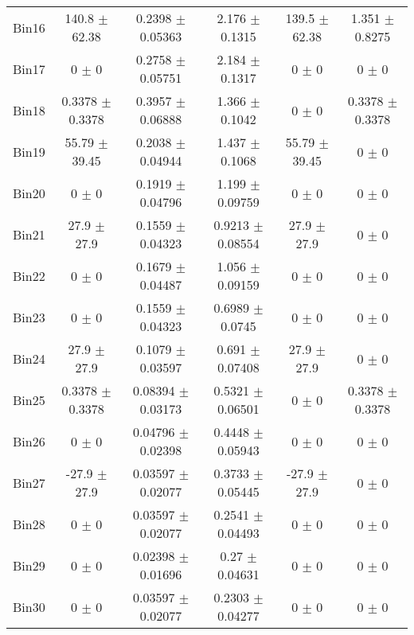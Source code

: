 \begin{tabular}{@{\extracolsep{4pt}}lccccc@{}}
     Bin16 & 140.8 $\pm$ 62.38 & 0.2398 $\pm$ 0.05363 & 2.176 $\pm$ 0.1315 & 139.5 $\pm$ 62.38 & 1.351 $\pm$ 0.8275 \\ 
     Bin17 & 0 $\pm$ 0 & 0.2758 $\pm$ 0.05751 & 2.184 $\pm$ 0.1317 & 0 $\pm$ 0 & 0 $\pm$ 0 \\ 
     Bin18 & 0.3378 $\pm$ 0.3378 & 0.3957 $\pm$ 0.06888 & 1.366 $\pm$ 0.1042 & 0 $\pm$ 0 & 0.3378 $\pm$ 0.3378 \\ 
     Bin19 & 55.79 $\pm$ 39.45 & 0.2038 $\pm$ 0.04944 & 1.437 $\pm$ 0.1068 & 55.79 $\pm$ 39.45 & 0 $\pm$ 0 \\ 
     Bin20 & 0 $\pm$ 0 & 0.1919 $\pm$ 0.04796 & 1.199 $\pm$ 0.09759 & 0 $\pm$ 0 & 0 $\pm$ 0 \\ 
     Bin21 & 27.9 $\pm$ 27.9 & 0.1559 $\pm$ 0.04323 & 0.9213 $\pm$ 0.08554 & 27.9 $\pm$ 27.9 & 0 $\pm$ 0 \\ 
     Bin22 & 0 $\pm$ 0 & 0.1679 $\pm$ 0.04487 & 1.056 $\pm$ 0.09159 & 0 $\pm$ 0 & 0 $\pm$ 0 \\ 
     Bin23 & 0 $\pm$ 0 & 0.1559 $\pm$ 0.04323 & 0.6989 $\pm$ 0.0745 & 0 $\pm$ 0 & 0 $\pm$ 0 \\ 
     Bin24 & 27.9 $\pm$ 27.9 & 0.1079 $\pm$ 0.03597 & 0.691 $\pm$ 0.07408 & 27.9 $\pm$ 27.9 & 0 $\pm$ 0 \\ 
     Bin25 & 0.3378 $\pm$ 0.3378 & 0.08394 $\pm$ 0.03173 & 0.5321 $\pm$ 0.06501 & 0 $\pm$ 0 & 0.3378 $\pm$ 0.3378 \\ 
     Bin26 & 0 $\pm$ 0 & 0.04796 $\pm$ 0.02398 & 0.4448 $\pm$ 0.05943 & 0 $\pm$ 0 & 0 $\pm$ 0 \\ 
     Bin27 & -27.9 $\pm$ 27.9 & 0.03597 $\pm$ 0.02077 & 0.3733 $\pm$ 0.05445 & -27.9 $\pm$ 27.9 & 0 $\pm$ 0 \\ 
     Bin28 & 0 $\pm$ 0 & 0.03597 $\pm$ 0.02077 & 0.2541 $\pm$ 0.04493 & 0 $\pm$ 0 & 0 $\pm$ 0 \\ 
     Bin29 & 0 $\pm$ 0 & 0.02398 $\pm$ 0.01696 & 0.27 $\pm$ 0.04631 & 0 $\pm$ 0 & 0 $\pm$ 0 \\ 
     Bin30 & 0 $\pm$ 0 & 0.03597 $\pm$ 0.02077 & 0.2303 $\pm$ 0.04277 & 0 $\pm$ 0 & 0 $\pm$ 0 \\ 
\hline\hline
  \end{tabular}

